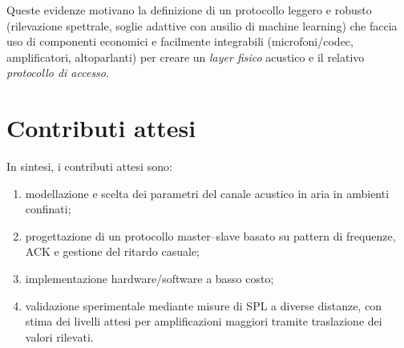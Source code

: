 Queste evidenze motivano la definizione di un protocollo leggero e robusto (rilevazione spettrale, soglie adattive con ausilio di machine learning) che faccia uso di componenti economici e facilmente integrabili (microfoni/codec, 
amplificatori, altoparlanti) per creare un \emph{layer fisico} acustico e il relativo \emph{protocollo di accesso}.

\section{Contributi attesi}
In sintesi, i contributi attesi sono: 
\begin{enumerate}
\item modellazione e scelta dei parametri del canale acustico in aria in ambienti confinati;
\item progettazione di un protocollo master--slave basato su pattern di frequenze, ACK e gestione del ritardo casuale;
\item implementazione hardware/software a basso costo;
\item validazione sperimentale mediante misure di SPL a diverse distanze, con stima dei livelli attesi per amplificazioni maggiori tramite traslazione dei valori rilevati.
\end{enumerate}
